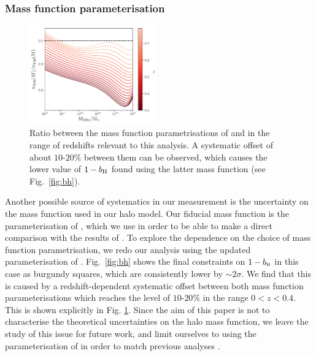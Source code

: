 \documentclass[useAMS,usenatbib]{mn2e}
\def\bH{b_{\scriptscriptstyle\rm H}}
\begin{document}
    \subsubsection{Mass function parameterisation}\label{sssec:results.syst.mf}
      \begin{figure}
        \centering
        \includegraphics[width=0.49\textwidth]{mf_ratio.pdf}
        \caption{Ratio between the mass function parametrisations of \citet{2008ApJ...688..709T} and \citet{2010ApJ...724..878T} in the range of redshifts relevant to this analysis. A systematic offset of about $10$-$20\%$ between them can be observed, which causes the lower value of $1-b_{\rm H}$ found using the latter mass function (see Fig.\!~\ref{fig:bh}). }
        \label{fig:mf_ratio}
      \end{figure}
      Another possible source of systematics in our measurement is the uncertainty on the mass function used in our halo model. Our fiducial mass function is the parameterisation of \cite{2008ApJ...688..709T}, which we use in order to be able to make a direct comparison with the results of \cite{2016A&A...594A..24P}. To explore the dependence on the choice of mass function parametrisation, we redo our analysis using the updated parameterisation of \cite{2010ApJ...724..878T}. Fig.\!~\ref{fig:bh} shows the final constraints on $1-\bH$ in this case as burgundy squares, which are consistently lower by $\sim 2\sigma$. We find that this is caused by a redshift-dependent systematic offset between both mass function parameterisations which reaches the level of $10$-$20\%$ in the range $0<z<0.4$. This is shown explicitly in Fig. \ref{fig:mf_ratio}. Since the aim of this paper is not to characterise the theoretical uncertainties on the halo mass function, we leave the study of this issue for future work, and limit ourselves to using the parameterisation of \cite{2008ApJ...688..709T} in order to match previous analyses \citep[e.g.][]{2016A&A...594A..24P,2018MNRAS.477.4957B,2018MNRAS.473.4318A,2019arXiv190407887Z,2019arXiv190707870M}.
\end{document}

